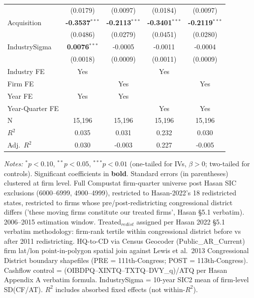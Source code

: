 \documentclass[11pt,a4paper]{article}
\begin{document}
\begin{table}[htbp]
\begin{tabular}{lcccc}
 & (0.0179) & (0.0097) & (0.0184) & (0.0097) \\
Acquisition & \textbf{-0.3537}$^{***}$ & \textbf{-0.2113}$^{***}$ & \textbf{-0.3401}$^{***}$ & \textbf{-0.2119}$^{***}$ \\
 & (0.0486) & (0.0279) & (0.0451) & (0.0280) \\
IndustrySigma & \textbf{0.0076}$^{***}$ & -0.0005 & -0.0011 & -0.0004 \\
 & (0.0018) & (0.0009) & (0.0011) & (0.0009) \\
\midrule
Industry FE & Yes &  & Yes &  \\
Firm FE &  & Yes &  & Yes \\
Year FE & Yes & Yes &  &  \\
Year-Quarter FE &  &  & Yes & Yes \\
\midrule
N & 15,196 & 15,196 & 15,196 & 15,196 \\
$R^2$ & 0.035 & 0.031 & 0.232 & 0.030 \\
Adj.~$R^2$ & 0.030 & -0.003 & 0.227 & -0.005 \\
\bottomrule
\end{tabular}
\begin{minipage}{\linewidth}
\vspace{2pt}\scriptsize
\textit{Notes:} $^{*}p<0.10$, $^{**}p<0.05$, $^{***}p<0.01$ (one-tailed for IVs, $\beta > 0$; two-tailed for controls).
 Significant coefficients in \textbf{bold}.
 Standard errors (in parentheses) clustered at firm level.
 Full Compustat firm-quarter universe post Hasan SIC exclusions (6000--6999, 4900--4999), restricted to Hasan-2022's 18 redistricted states, restricted to firms whose pre/post-redistricting congressional district differs ('these moving firms constitute our treated firms', Hasan \S5.1 verbatim). 2006--2015 estimation window. Treated$_{redist}$ assigned per Hasan 2022 \S5.1 verbatim methodology: firm-rank tertile within congressional district before vs after 2011 redistricting. HQ-to-CD via Census Geocoder (Public\_AR\_Current) firm lat/lon point-in-polygon spatial join against Lewis et al.\ 2013 Congressional District boundary shapefiles (PRE = 111th-Congress; POST = 113th-Congress). Cashflow control = (OIBDPQ--XINTQ--TXTQ--DVY\_q)/ATQ per Hasan Appendix A verbatim formula. IndustrySigma = 10-year SIC2 mean of firm-level SD(CF/AT).
 $R^2$ includes absorbed fixed effects (not within-$R^2$).
\end{minipage}
\end{table}
\clearpage
\end{document}

